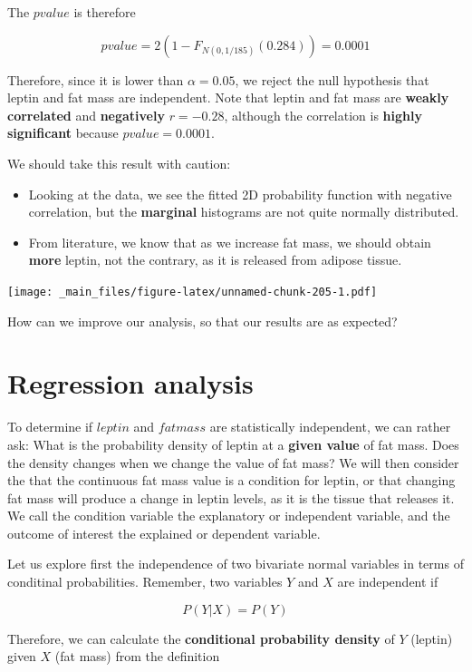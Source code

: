 \documentclass[
]{book}
\begin{document}
The \(pvalue\) is therefore

\[pvalue=2(1- F_{N(0,1/185)}(0.284))=0.0001\]

Therefore, since it is lower than \(\alpha=0.05\), we reject the null hypothesis that leptin and fat mass are independent. Note that leptin and fat mass are \textbf{weakly correlated} and \textbf{negatively} \(r=-0.28\), although the correlation is \textbf{highly significant} because \(pvalue=0.0001\).

We should take this result with caution:

\begin{itemize}
\item
  Looking at the data, we see the fitted 2D probability function with negative correlation, but the \textbf{marginal} histograms are not quite normally distributed.
\item
  From literature, we know that as we increase fat mass, we should obtain \textbf{more} leptin, not the contrary, as it is released from adipose tissue.
\end{itemize}

\texttt{[image: \_main\_files/figure-latex/unnamed-chunk-205-1.pdf]}

How can we improve our analysis, so that our results are as expected?

\hypertarget{regression-analysis}{%
\section{Regression analysis}\label{regression-analysis}}

To determine if \(leptin\) and \(fatmass\) are statistically independent, we can rather ask: What is the probability density of leptin at a \textbf{given value} of fat mass. Does the density changes when we change the value of fat mass? We will then consider the that the continuous fat mass value is a condition for leptin, or that changing fat mass will produce a change in leptin levels, as it is the tissue that releases it. We call the condition variable the explanatory or independent variable, and the outcome of interest the explained or dependent variable.

Let us explore first the independence of two bivariate normal variables in terms of conditinal probabilities. Remember, two variables \(Y\) and \(X\) are independent if

\[P(Y|X)=P(Y)\]

Therefore, we can calculate the \textbf{conditional probability density} of \(Y\) (leptin) given \(X\) (fat mass) from the definition
\end{document}
